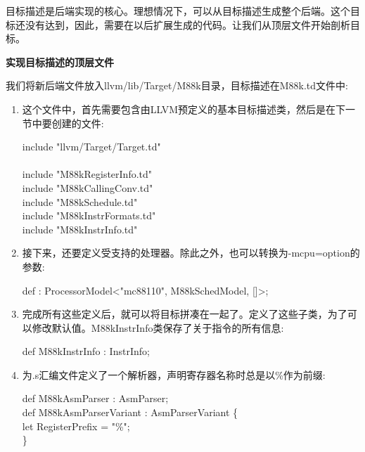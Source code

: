 
目标描述是后端实现的核心。理想情况下，可以从目标描述生成整个后端。这个目标还没有达到，因此，需要在以后扩展生成的代码。让我们从顶层文件开始剖析目标。\par

\hspace*{\fill} \par %
\textbf{实现目标描述的顶层文件}

我们将新后端文件放入llvm/lib/Target/M88k目录，目标描述在M88k.td文件中:\par

\begin{enumerate}
\item 这个文件中，首先需要包含由LLVM预定义的基本目标描述类，然后是在下一节中要创建的文件:
\begin{tcolorbox}[colback=white,colframe=black]
include "llvm/Target/Target.td" \\
\\
include "M88kRegisterInfo.td" \\
include "M88kCallingConv.td" \\
include "M88kSchedule.td" \\
include "M88kInstrFormats.td" \\
include "M88kInstrInfo.td"
\end{tcolorbox}

\item 接下来，还要定义受支持的处理器。除此之外，也可以转换为-mcpu=option的参数:
\begin{tcolorbox}[colback=white,colframe=black]
def : ProcessorModel<"mc88110", M88kSchedModel, []>;
\end{tcolorbox}

\item 完成所有这些定义后，就可以将目标拼凑在一起了。定义了这些子类，为了可以修改默认值。M88kInstrInfo类保存了关于指令的所有信息:
\begin{tcolorbox}[colback=white,colframe=black]
def M88kInstrInfo : InstrInfo;
\end{tcolorbox}

\item 为.s汇编文件定义了一个解析器，声明寄存器名称时总是以\%作为前缀:
\begin{tcolorbox}[colback=white,colframe=black]
def M88kAsmParser : AsmParser; \\
def M88kAsmParserVariant : AsmParserVariant \{ \\
\hspace*{1cm}let RegisterPrefix = "\%"; \\
\}
\end{tcolorbox}


\end{enumerate}
